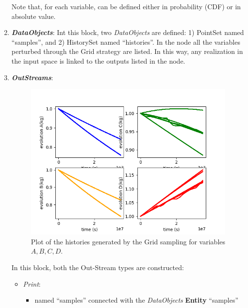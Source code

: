 \begin{enumerate}
  Note that, for each variable, can be defined either in probability (CDF) or in absolute value.
   \item \textbf{\textit{DataObjects}}:
  Int this block, two \textit{DataObjects} are defined: 1) PointSet named
  ``samples'', and 2) HistorySet named ``histories''.
  In the  node all the variables
  perturbed through the Grid strategy are listed. In this way, any
  realization in the input space is linked to the outputs listed in  the
   node.
   \item \textbf{\textit{OutStreams}}:
 \begin{figure}[h!]
  \centering
  \includegraphics[scale=0.7]{../../tests/framework/user_guide/ForwardSamplingStrategies/gold/RunDir/Grid/1-historyPlot_line-line-line-line.png}
  \caption{Plot of the histories generated by the Grid sampling for variables $A,B,C,D$.}
  \label{fig:historiesGridPlotLine}
 \end{figure}
  In this block, both the Out-Stream types are constructed:
  \begin{itemize}
    \item \textit{Print}:
     \begin{itemize}
       \item named ``samples'' connected with the \textit{DataObjects} \textbf{Entity} ``samples''

\end{itemize}
\end{itemize}
\end{enumerate}
